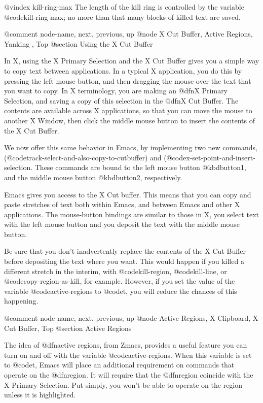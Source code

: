 {{{{{{{{@vindex kill-ring-max
  The length of the kill ring is controlled by the variable
@code{kill-ring-max}; no more than that many blocks of killed text are
saved.

@comment  node-name,  next,  previous,  up
@node X Cut Buffer, Active Regions, Yanking , Top
@section Using the X Cut Buffer

In X, using the X Primary Selection and the X Cut Buffer gives you a
simple way to copy text between applications.  In a typical X
application, you do this by pressing the left mouse button, and then
dragging the mouse over the text that you want to copy.  In X
terminology, you are making an @dfn{X Primary Selection}, and saving a
copy of this selection in the @dfn{X Cut Buffer}. The contents are
available across X applications, so that you can move the mouse to
another X Window, then click the middle mouse button to insert the
contents of the X Cut Buffer.

We now offer this same behavior in Emacs, by implementing two new
commands, (@code{track-select-and-also-copy-to-cutbuffer}) and
(@code{x-set-point-and-insert-selection}. These commands are bound 
to the left mouse button @kbd{button1}, and the middle mouse button
@kbd{button2}, respectively.

Emacs gives you access to the X Cut buffer. This means that you can
copy and paste stretches of text both within Emacs, and between
Emacs and other X applications. The mouse-button bindings are similar
to those in X,
you select text with the left mouse button and you deposit the 
text with the middle mouse button.

Be sure that you don't inadvertently
replace the contents of the X Cut Buffer before depositing the text
where you want. This would happen if you killed a different
stretch in the interim, with @code{kill-region},  
@code{kill-line}, or
@code{copy-region-as-kill}, for example.
However, if you set the value of the variable @code{active-regions} to 
@code{t}, you will reduce the chances of this happening.

@comment  node-name,  next,  previous,  up
@node Active Regions, X Clipboard, X Cut Buffer, Top
@section Active Regions

The idea of @dfn{active regions}, from Zmacs, provides a useful feature
you can turn on and off with the variable @code{active-regions}.  When
this variable is set to @code{t}, Emacs will place an additional
requirement on commands that operate on the @dfn{region}.  It will
require that the @dfn{region} coincide with the X Primary Selection.
Put simply, you won't be able to operate on the region unless
it is highlighted.

}}}}}}}}
